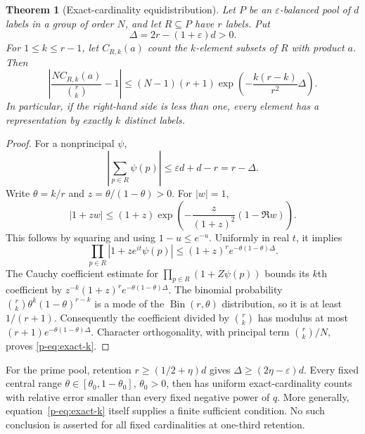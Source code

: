 \documentclass[11pt,a4paper]{article}
\newtheorem{theorem}{Theorem}[section]
\theoremstyle{definition}
\theoremstyle{remark}
\begin{document}
\begin{theorem}[Exact-cardinality equidistribution]\label{p-thm:exact-k}
Let $P$ be an $\varepsilon$-balanced pool of $d$ labels in a group of
order $N$, and let $R\subseteq P$ have $r$ labels. Put
\[
 \Delta=2r-(1+\varepsilon)d>0.
\]
For $1\le k\le r-1$, let $C_{R,k}(a)$ count the $k$-element subsets
of $R$ with product $a$. Then
\begin{equation}\label{p-eq:exact-k}
 \left|\frac{N C_{R,k}(a)}{\binom rk}-1\right|
 \le (N-1)(r+1)
 \exp\left(-\frac{k(r-k)}{r^2}\Delta\right).
\end{equation}
In particular, if the right-hand side is less than one, every element
has a representation by exactly $k$ distinct labels.
\end{theorem}
\begin{proof}
For a nonprincipal $\psi$,
\[
 \left|\sum_{p\in R}\psi(p)\right|
 \le\varepsilon d+d-r=r-\Delta.
\]
Write $\theta=k/r$ and $z=\theta/(1-\theta)>0$. For $|w|=1$,
\[
 |1+zw|\le(1+z)
 \exp\left(-\frac{z}{(1+z)^2}(1-\Re w)\right).
\]
This follows by squaring and using $1-u\le e^{-u}$.
Uniformly in real $t$, it implies
\[
 \prod_{p\in R}|1+ze^{it}\psi(p)|
 \le(1+z)^r e^{-\theta(1-\theta)\Delta}.
\]
The Cauchy coefficient estimate for
$\prod_{p\in R}(1+Z\psi(p))$ bounds its $k$th coefficient by
$z^{-k}(1+z)^r e^{-\theta(1-\theta)\Delta}$.
The binomial probability
$\binom rk\theta^k(1-\theta)^{r-k}$ is a mode of the
$\operatorname{Bin}(r,\theta)$ distribution, so it is at least
$1/(r+1)$. Consequently the coefficient divided by $\binom rk$ has
modulus at most $(r+1)e^{-\theta(1-\theta)\Delta}$.
Character orthogonality, with principal term $\binom rk/N$, proves
\eqref{p-eq:exact-k}.
\end{proof}

For the prime pool, retention $r\ge(1/2+\eta)d$ gives
$\Delta\ge(2\eta-\varepsilon)d$. Every fixed central range
$\theta\in[\theta_0,1-\theta_0]$, $\theta_0>0$, then has uniform
exact-cardinality counts with relative error smaller than every fixed
negative power of $q$. More generally, equation~\eqref{p-eq:exact-k}
itself supplies a finite sufficient condition. No such conclusion is
asserted for all fixed cardinalities at one-third retention.
\end{document}
